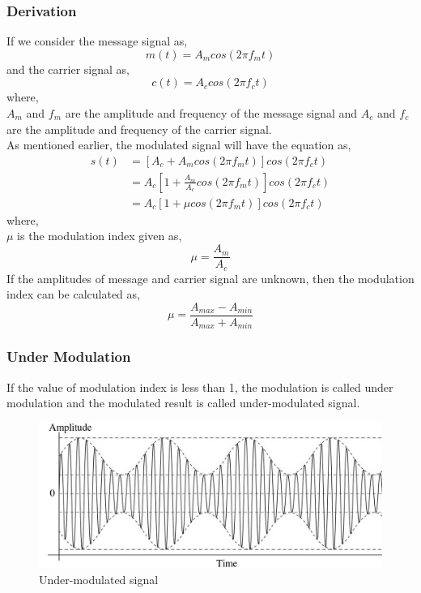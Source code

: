 \documentclass{lab_sheet}
\begin{document}
    \subsubsection*{Derivation}
    If we consider the message signal as,
    $$
    m(t)=A_m cos(2\pi f_m t)
    $$
    and the carrier signal as,
    $$
    c(t)=A_c cos(2\pi f_c t)
    $$
    where, \\
    $A_m$ and $f_m$ are the amplitude and frequency of the message signal and $A_c$ and $f_c$ are the amplitude and frequency of the carrier signal. \\
    As mentioned earlier, the modulated signal will have the equation as,
    \begin{equation*}
        \begin{aligned}
            s(t)&=[A_c + A_m cos(2\pi f_m t)]cos(2\pi f_c t)\\
            &=A_c[1 + \frac{A_m}{A_c} cos(2\pi f_m t)]cos(2\pi f_c t)\\
            &=A_c[1 + \mu cos(2\pi f_m t)]cos(2\pi f_c t)
        \end{aligned}
    \end{equation*}
    where, \\
    $\mu$ is the modulation index given as,
    $$\mu=\frac{A_m}{A_c}$$
    If the amplitudes of message and carrier signal are unknown, then the modulation index can be calculated as,
    $$
    \mu = \frac{A_{max}-A_{min}}{A_{max}+A_{min}}
    $$
    \subsubsection{Under Modulation}
    If the value of modulation index is less than 1, the modulation is called under modulation and the modulated result is called under-modulated signal.
    \begin{figure}[H]
        \centering
        \includegraphics[width=.95\linewidth]{./Figures/under.png}
        \caption{Under-modulated signal}
        \label{fig:under}
    \end{figure}
\end{document}
